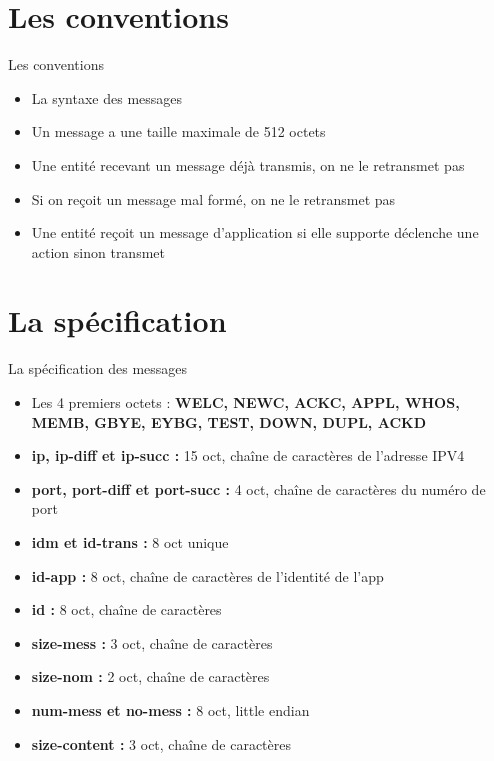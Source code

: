 \documentclass{beamer}
\begin{document}
\section{Les conventions}
\begin{frame}{Les conventions}
	 \begin{itemize}
		 \item<1-5> La syntaxe des messages
		 \item<2-5> Un message a une taille maximale de 512 octets
 		 \item<3-5> Une entité recevant un message déjà transmis, on ne le retransmet pas
 		 \item<4-5> Si on reçoit un message mal formé, on ne le retransmet pas
 		 \item<5-5> Une entité reçoit un message d'application si elle supporte déclenche une action sinon transmet
	\end{itemize}
\end{frame}

\section{La spécification}
\begin{frame}{La spécification des messages}
	 \begin{itemize}
		 \item<1-11> Les 4 premiers octets : \textbf{WELC, NEWC, ACKC, APPL, WHOS, MEMB, GBYE, EYBG, TEST, DOWN, DUPL, ACKD}
		 \item<2-11> \textbf{ip, ip-diff et ip-succ :} 15 oct, chaîne de caractères de l'adresse IPV4
 		 \item<3-11> \textbf{port, port-diff et port-succ :} 4 oct, chaîne de caractères du numéro de port
 		 \item<4-11> \textbf{idm et id-trans :} 8 oct unique
 		 \item<5-11> \textbf{id-app :} 8 oct, chaîne de caractères de l'identité de l'app
 		 \item<6-11> \textbf{id :} 8 oct, chaîne de caractères
 		 \item<7-11> \textbf{size-mess :} 3 oct, chaîne de caractères 
 		 \item<8-11> \textbf{size-nom :} 2 oct, chaîne de caractères
 		 \item<9-11> \textbf{num-mess et no-mess :} 8 oct, little endian
 		 \item<10-11> \textbf{size-content :} 3 oct, chaîne de caractères
	\end{itemize}
\end{frame}
\end{document}

